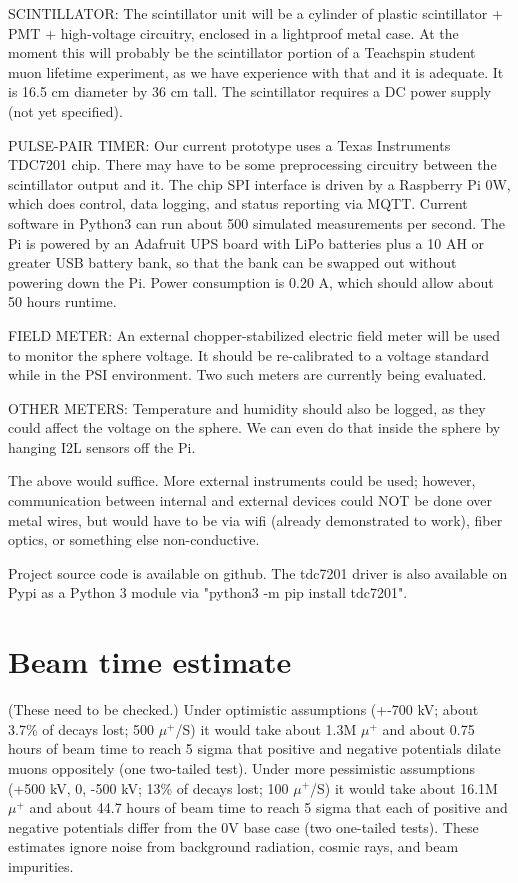 \documentclass[12pt]{amsart}
\theoremstyle{plain}
\theoremstyle{definition}
\theoremstyle{remark}
\begin{document}
SCINTILLATOR: The scintillator unit will be a cylinder of plastic scintillator + PMT + high-voltage circuitry, enclosed in a lightproof metal case.
At the moment this will probably be the scintillator portion
of a Teachspin student muon lifetime experiment,
as we have experience with that and it is adequate.
It is 16.5 cm diameter by 36 cm tall.
The scintillator requires a DC power supply (not yet specified).

PULSE-PAIR TIMER: Our current prototype uses a Texas Instruments TDC7201 chip.\cite{TDC7201}
There may have to be some preprocessing circuitry between the scintillator output and it.
The chip SPI interface is driven by a Raspberry Pi 0W,
which does control, data logging, and status reporting via MQTT.
Current software in Python3 can run about 500 simulated measurements per second.
The Pi is powered by an Adafruit UPS board with LiPo batteries
plus a 10 AH or greater USB battery bank,
so that the bank can be swapped out without powering down the Pi.
Power consumption is 0.20 A, which should allow about 50 hours runtime.

FIELD METER: An external chopper-stabilized electric field meter will be used to monitor the sphere voltage. It should be re-calibrated to a voltage standard while in the PSI environment. Two such meters are currently being evaluated.

OTHER METERS: Temperature and humidity should also be logged, as they could affect the voltage on the sphere.
We can even do that inside the sphere by hanging I2L sensors off the Pi.

The above would suffice.
More external instruments could be used;
however, communication between internal and external devices
could NOT be done over metal wires,
but would have to be via wifi (already demonstrated to work), fiber optics, or something else non-conductive.

Project source code is available on github.\cite{qtd_github}
The tdc7201 driver is also available on Pypi as a Python 3 module via "python3 -m pip install tdc7201".

\section{Beam time estimate}

(These need to be checked.)
Under optimistic assumptions (+-700 kV; about 3.7\% of decays lost; 500 $\mu^+$/S)
it would take about 1.3M $\mu^+$ and about 0.75 hours of beam time to reach 5 sigma
that positive and negative potentials dilate muons oppositely (one two-tailed test).
Under more pessimistic assumptions (+500 kV, 0, -500 kV; 13\% of decays lost; 100 $\mu^+$/S)
it would take about 16.1M $\mu^+$ and about 44.7 hours of beam time to reach 5 sigma
that each of positive and negative potentials differ from the 0V base case (two one-tailed tests).
These estimates ignore noise from background radiation, cosmic rays, and beam impurities.
\end{document}
